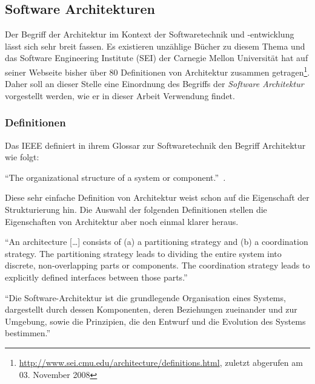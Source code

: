 \subsection{Software Architekturen} %
\label{sub:definition_software_architekturen}

  Der Begriff der Architektur im Kontext der Softwaretechnik und -entwicklung lässt sich sehr breit fassen. Es existieren unzählige Bücher zu diesem Thema und das Software Engineering Institute (SEI) der Carnegie Mellon Universität hat auf seiner Webseite bisher über 80 Definitionen von Architektur zusammen getragen\footnote{\url{http://www.sei.cmu.edu/architecture/definitions.html}, zuletzt abgerufen am 03. November 2008}. Daher soll an dieser Stelle eine Einordnung des Begriffs der \emph{Software Architektur} vorgestellt werden, wie er in dieser Arbeit Verwendung findet.
  
\subsubsection{Definitionen} %
\label{ssub:definitionen_architektur}

  Das IEEE definiert in ihrem Glossar zur Softwaretechnik den Begriff Architektur wie folgt:
  
  \begin{definition}\label{def:architektur_ieee}
    "`The organizational structure of a system or component."'~\emph{\citep{ieee90sg}.}
  \end{definition}
  
  Diese sehr einfache Definition von Architektur weist schon auf die Eigenschaft der Strukturierung hin. Die Auswahl der folgenden Definitionen stellen die Eigenschaften von Architektur aber noch einmal klarer heraus.
  
  \begin{definition}\label{def:architektur_crispen}
    "`An architecture [\ldots] consists of (a) a partitioning strategy and (b) a coordination strategy. The partitioning strategy leads to dividing the entire system into discrete, non-overlapping parts or components. The coordination strategy leads to explicitly defined interfaces between those parts."'~\emph{\citep[S. 272]{crispen1994sm}}
  \end{definition}
  
  \begin{definition}\label{def:architektur_reussner_et_al}
    "`Die Software-Architektur ist die grundlegende Organisation eines Systems, dargestellt durch dessen Komponenten, deren Beziehungen zueinander und zur Umgebung, sowie die Prinzipien, die den Entwurf und die Evolution des Systems bestimmen."'~\emph{\citep[S. 1]{handbuch_der_software_architektur}}
  \end{definition}
  
